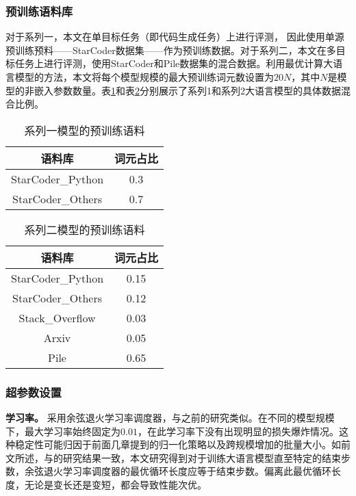 \subsubsection{预训练语料库}
对于系列一，本文在单目标任务（即代码生成任务）上进行评测， 因此使用单源预训练预料——StarCoder数据集\citep{li2023starcoder}——作为预训练数据。对于系列二，本文在多目标任务上进行评测，使用StarCoder和Pile数据集\citep{gao2020pile}的混合数据。利用最优计算大语言模型的方法\citep{hoffmann2022training}，本文将每个模型规模的最大预训练词元数设置为\(20N\)，其中\(N\)是模型的非嵌入参数数量。表\ref{tab:series1_data_mixture}和表\ref{tab:series2_data_mixture}分别展示了系列1和系列2大语言模型的具体数据混合比例。


\begin{table}
        \centering
        \caption{系列一模型的预训练语料}
        \begin{tabular}{c|c}
        \toprule
           语料库   &  词元占比 \\
        \midrule
        StarCoder\_Python &  0.3\\
        StarCoder\_Others &  0.7\\
    \bottomrule
        \end{tabular}
        \label{tab:series1_data_mixture}
    \centering
\end{table}

\begin{table}
    \centering
    \caption{系列二模型的预训练语料}
    \begin{tabular}{c|c}
    \toprule
       语料库   &  词元占比 \\
    \midrule
    StarCoder\_Python &  0.15\\
    StarCoder\_Others &  0.12\\
    Stack\_Overflow & 0.03 \\
    Arxiv & 0.05 \\
    Pile & 0.65 \\
\bottomrule
    \end{tabular}
    \label{tab:series2_data_mixture}
\end{table}


\subsubsection{超参数设置}
\label{app:hyperparameters}
\textbf{学习率。} 采用余弦退火学习率调度器，与之前的研究\citep{touvron2023llama, touvron2023llama2, hoffmann2022training}类似。在不同的模型规模下，最大学习率始终固定为\(0.01\)，在此学习率下没有出现明显的损失爆炸情况。这种稳定性可能归因于前面几章提到的归一化策略\citep{yang2022tensor}以及跨规模增加的批量大小。如前文所述，与\citet{hoffmann2022training}的研究结果一致，本文研究得到对于训练大语言模型直至特定的结束步数，余弦退火学习率调度器的最优循环长度应等于结束步数。偏离此最优循环长度，无论是变长还是变短，都会导致性能次优。

